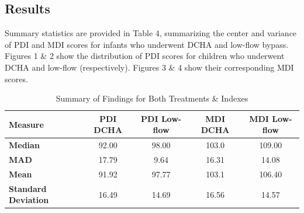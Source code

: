 \documentclass{article}
\begin{document}
\begin{enumerate}
		\subsection*{Results}
		Summary statistics are provided in Table 4, summarizing the center and variance of PDI and MDI scores for infants who underwent DCHA and low-flow bypass. Figures 1 \& 2 show the distribution of PDI scores for children who underwent DCHA and low-flow (respectively). Figures 3 \& 4 show their corresponding MDI scores.
		\begin{table}[h!]
			\centering
			\footnotesize
			\caption{Summary of Findings for Both Treatments \& Indexes}
			\label{tab:summary_statistics}
			\begin{tabular}{lcccc}
			\toprule
			\textbf{Measure}          & \textbf{PDI DCHA} & \textbf{PDI Low-flow} & \textbf{MDI DCHA} & \textbf{MDI Low-flow} \\ 
			\midrule
			\textbf{Median}           & 92.00             & 98.00                & 103.0             & 109.00              \\ 
			\textbf{MAD}              & 17.79             & 9.64                 & 16.31             & 14.08               \\ 
			\textbf{Mean}             & 91.92             & 97.77                & 103.1             & 106.40              \\ 
			\textbf{Standard Deviation} & 16.49            & 14.69                & 16.56             & 14.57               \\ 
			\bottomrule
			\end{tabular}
		\end{table}


\end{enumerate}
\end{document}
